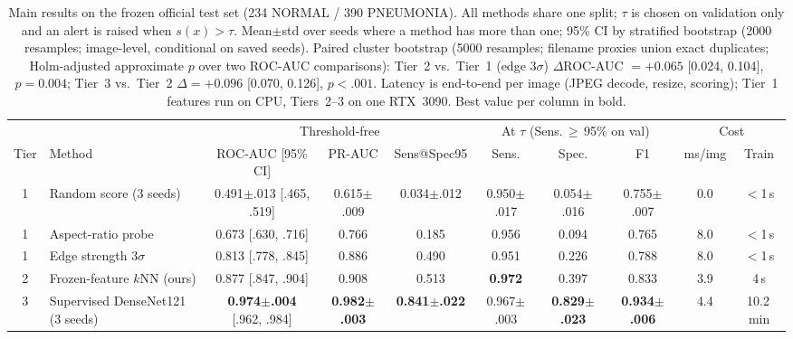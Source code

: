 \begin{table}[t]
\centering
\footnotesize
\setlength{\tabcolsep}{3.5pt}
\begin{adjustbox}{max width=\textwidth}
\begin{tabular}{clcccccccc}
\toprule
 & & \multicolumn{3}{c}{Threshold-free} & \multicolumn{3}{c}{At $\tau$ (Sens.\,$\geq$\,95\% on val)} & \multicolumn{2}{c}{Cost} \\
\cmidrule(lr){3-5}\cmidrule(lr){6-8}\cmidrule(lr){9-10}
Tier & Method & ROC-AUC {\scriptsize[95\% CI]} & PR-AUC & Sens@Spec95 & Sens. & Spec. & F1 & ms/img & Train \\
\midrule
1 & Random score (3 seeds) & 0.491{\scriptsize$\pm$.013} {\scriptsize[.465, .519]} & 0.615{\scriptsize$\pm$.009} & 0.034{\scriptsize$\pm$.012} & 0.950{\scriptsize$\pm$.017} & 0.054{\scriptsize$\pm$.016} & 0.755{\scriptsize$\pm$.007} & 0.0 & $<$1\,s \\
1 & Aspect-ratio probe & 0.673 {\scriptsize[.630, .716]} & 0.766 & 0.185 & 0.956 & 0.094 & 0.765 & 8.0 & $<$1\,s \\
1 & Edge strength $3\sigma$ & 0.813 {\scriptsize[.778, .845]} & 0.886 & 0.490 & 0.951 & 0.226 & 0.788 & 8.0 & $<$1\,s \\
\midrule
2 & Frozen-feature $k$NN (ours) & 0.877 {\scriptsize[.847, .904]} & 0.908 & 0.513 & \textbf{0.972} & 0.397 & 0.833 & 3.9 & 4\,s \\
\midrule
3 & Supervised DenseNet121 (3 seeds) & \textbf{0.974{\scriptsize$\pm$.004}} {\scriptsize[.962, .984]} & \textbf{0.982{\scriptsize$\pm$.003}} & \textbf{0.841{\scriptsize$\pm$.022}} & 0.967{\scriptsize$\pm$.003} & \textbf{0.829{\scriptsize$\pm$.023}} & \textbf{0.934{\scriptsize$\pm$.006}} & 4.4 & 10.2\,min \\
\bottomrule
\end{tabular}
\end{adjustbox}
\caption{Main results on the frozen official test set (234 NORMAL / 390 PNEUMONIA). All methods share one split; $\tau$ is chosen on validation only and an alert is raised when $s(x) > \tau$. Mean{\scriptsize$\pm$std} over seeds where a method has more than one; 95\% CI by stratified bootstrap (2000 resamples; image-level, conditional on saved seeds). Paired cluster bootstrap (5000 resamples; filename proxies union exact duplicates; Holm-adjusted approximate $p$ over two ROC-AUC comparisons): Tier~2 vs.\ Tier~1 (edge $3\sigma$) $\Delta$ROC-AUC $= +0.065$ [0.024, 0.104], $p = 0.004$; Tier~3 vs.\ Tier~2 $\Delta = +0.096$ [0.070, 0.126], $p <.001$. Latency is end-to-end per image (JPEG decode, resize, scoring); Tier~1 features run on CPU, Tiers~2--3 on one RTX~3090. Best value per column in bold.}
\label{tab:main}
\end{table}
